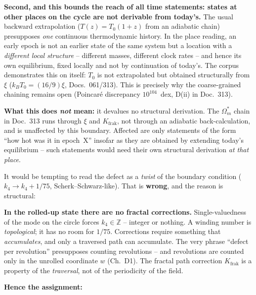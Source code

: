 \textbf{Second, and this bounds the reach of all time statements:
states at other places on the cycle are not derivable from
today's.} The usual backward extrapolation ($T(z) = T_0(1+z)$ from
an adiabatic chain) presupposes \emph{one} continuous
thermodynamic history. In the place reading, an early epoch is not
an earlier state of the same system but a location with a
\emph{different local structure} -- different masses, different
clock rates -- and hence its own equilibrium, fixed locally and
not by continuation of today's. The corpus demonstrates this on
itself: $T_0$ is not extrapolated but obtained structurally from
$\xi$ ($k_BT_0 = (16/9)\xi$, Docs.~061/313). This is precisely why
the coarse-grained chaining remains open (Poincaré discrepancy
$10^{104}$~dex, D(ii) in Doc.~313).

\noindent \textbf{What this does \emph{not} mean:} it devalues no
structural derivation. The $\Omega_m^{*}$ chain in Doc.~313 runs
through $\xi$ and $K_\text{frak}$, not through an adiabatic
back-calculation, and is unaffected by this boundary. Affected are
only statements of the form \enquote{how hot was it in epoch~X}
insofar as they are obtained by extending today's equilibrium --
such statements would need their own structural derivation
\emph{at that place}.

It would be tempting to read the defect as a \emph{twist} of the
boundary condition ($k_4 \to k_4 + 1/75$, Scherk--Schwarz-like).
That is \textbf{wrong}, and the reason is structural:

\textbf{In the rolled-up state there are no fractal corrections.}
Single-valuedness of the mode on the circle forces
$k_4 \in \mathbb{Z}$ -- integer or nothing. A winding number is
\emph{topological}; it has no room for $1/75$. Corrections require
something that \emph{accumulates}, and only a traversed path can
accumulate. The very phrase \enquote{defect per revolution}
presupposes counting revolutions -- and revolutions are counted
only in the unrolled coordinate $w$ (Ch.~D1). The fractal path
correction $K_\text{frak}$ is a property of the \emph{traversal},
not of the periodicity of the field.

\textbf{Hence the assignment:}

